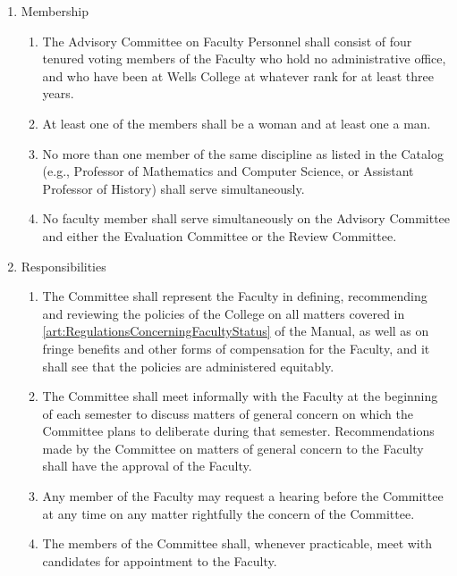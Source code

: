 \documentclass{manual}
\newcommand{\itemLevelA}{\alph*.}
\newcommand{\itemLevelB}{\arabic*)}
\newcommand{\itemRefA}{\alph*}
\newcommand{\itemRefB}{\arabic*}
\begin{document}
\begin{enumerate}[label=\itemLevelA,ref=\itemRefA]
\item Membership \label{item:membership06}
\begin{enumerate}[label=\itemLevelB,ref=\itemRefB]
\item The Advisory Committee on Faculty Personnel shall consist of four tenured voting members of the Faculty who hold no administrative office, and who have been at Wells College at whatever rank for at least three years.
\item At least one of the members shall be a woman and at least one a man.
\item\label{iitem:crossdiscipline07} No more than one member of the same discipline as listed in the Catalog (e.g., Professor of Mathematics and Computer Science, or Assistant Professor of History) shall serve simultaneously.
\item No faculty member shall serve simultaneously on the Advisory Committee and either the Evaluation Committee or the Review Committee.
\end{enumerate}
\item Responsibilities
\begin{enumerate}[label=\itemLevelB,ref=\itemRefB]
\item The Committee shall represent the Faculty in defining, recommending and reviewing the policies of the College on all matters covered in \cref{art:RegulationsConcerningFacultyStatus} of the Manual, as well as on fringe benefits and other forms of compensation for the Faculty, and it shall see that the policies are administered equitably.
\item The Committee shall meet informally with the Faculty at the beginning of each semester to discuss matters of general concern on which the Committee plans to deliberate during that semester. Recommendations made by the Committee on matters of general concern to the Faculty shall have the approval of the Faculty.
\item Any member of the Faculty may request a hearing before the Committee at any time on any matter rightfully the concern of the Committee.
\item The members of the Committee shall, whenever practicable, meet with candidates for appointment to the Faculty.


\end{enumerate}
\end{enumerate}
\end{document}
